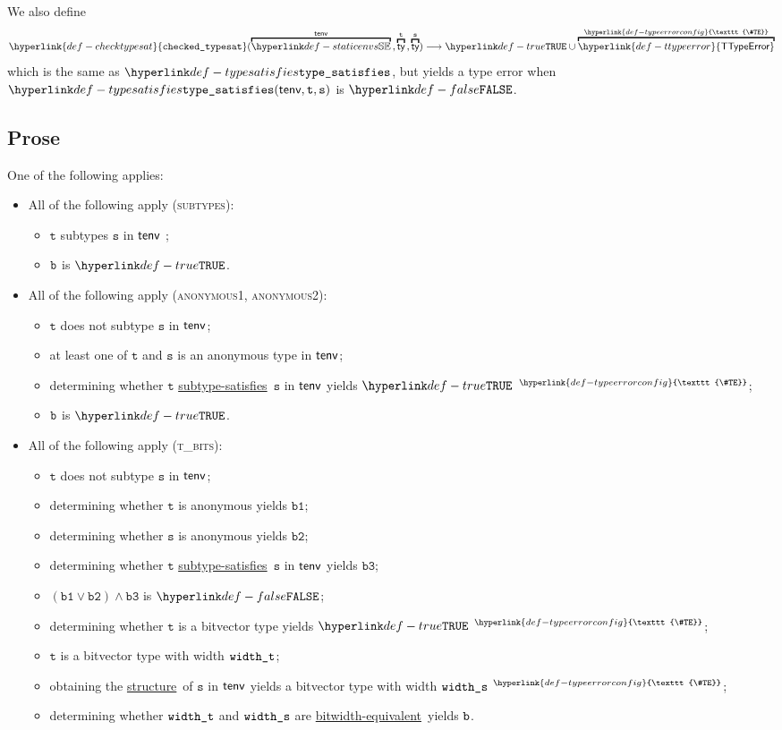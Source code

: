 \documentclass{book}
\newcommand\TTypeError[0]{\hyperlink{def-ttypeerror}{\textsf{TTypeError}}}
\newcommand\TypeErrorConfig[0]{\hyperlink{def-typeerrorconfig}{\texttt{\#TE}}}
\newcommand\ProseOrTypeError[0]{\hyperlink{def-proseortypeerror}{$^{\TypeErrorConfig}$}}
\newcommand\checktypesat[0]{\hyperlink{def-checktypesat}{\texttt{checked\_typesat}}}
\newcommand\structure[0]{\hyperlink{def-structure}{structure}}
\newcommand\subtypesatisfies[0]{\hyperlink{def-subtypesatisfies}{subtype-satisfies}}
\newcommand\bitwidthequivalent[0]{\hyperlink{def-bitwidthequal}{bitwidth-equivalent}}
\newcommand\vt[0]{\texttt{t}}
\newcommand\vs[0]{\texttt{s}}
\newcommand\vbone[0]{\texttt{b1}}
\newcommand\vbtwo[0]{\texttt{b2}}
\newcommand\vbthree[0]{\texttt{b3}}
\begin{document}
\hypertarget{def-checktypesat}{}
We also define
\[
  \checktypesat(\overname{\staticenvs}{\tenv} \aslsep \overname{\ty}{\vt} \aslsep \overname{\ty}{\vs})
  \aslto \True \cup \overname{\TTypeError}{\TypeErrorConfig}
\]
which is the same as $\typesat$, but yields a type error when \\ $\typesat(\tenv, \vt, \vs)$ is $\False$.

\subsection{Prose}
One of the following applies:
 \begin{itemize}
  \item All of the following apply (\textsc{subtypes}):
    \begin{itemize}
    \item $\vt$ subtypes $\vs$ in $\textsf{tenv}$ ;
    \item $\texttt{b}$ is $\True$.
  \end{itemize}

  \item All of the following apply (\textsc{anonymous1}, \textsc{anonymous2}):
  \begin{itemize}
    \item $\vt$ does not subtype $\vs$ in $\textsf{tenv}$;
    \item at least one of $\vt$ and $\vs$ is an anonymous type in $\textsf{tenv}$;
    \item determining whether $\vt$ \subtypesatisfies\ $\vs$ in $\textsf{tenv}$ yields $\True$ \ProseOrTypeError;
    \item $\texttt{b}$ is $\True$.
  \end{itemize}

  \item All of the following apply (\textsc{t\_bits}):
  \begin{itemize}
    \item $\vt$ does not subtype $\vs$ in $\textsf{tenv}$;
    \item determining whether $\vt$ is anonymous yields $\vbone$;
    \item determining whether $\vs$ is anonymous yields $\vbtwo$;
    \item determining whether $\vt$ \subtypesatisfies\ $\vs$ in $\textsf{tenv}$ yields $\vbthree$;
    \item $(\vbone \lor \vbtwo) \land \vbthree$ is $\False$;
    \item determining whether $\vt$ is a bitvector type yields $\True$ \ProseOrTypeError;
    \item $\vt$ is a bitvector type with width $\texttt{width\_t}$;
    \item obtaining the \structure\ of $\vs$ in $\textsf{tenv}$ yields a bitvector type with width $\texttt{width\_s}$ \ProseOrTypeError;
    \item determining whether $\texttt{width\_t}$ and $\texttt{width\_s}$ are \bitwidthequivalent\ yields $\texttt{b}$.
  \end{itemize}


\end{itemize}
\end{document}
